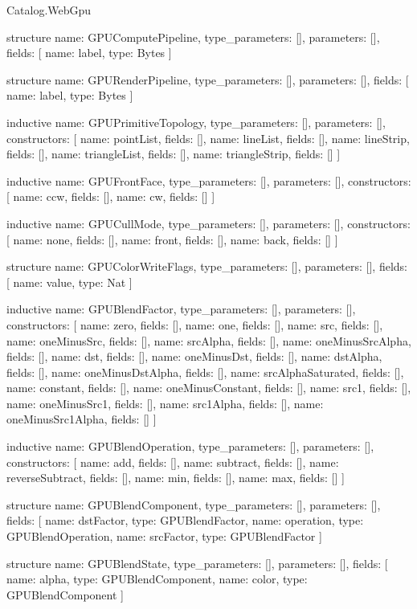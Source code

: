 \begin{lexlean}{Catalog.WebGpu}
\begin{semanticmodule}
structure{
  name: GPUComputePipeline,
  type_parameters: [],
  parameters: [],
  fields: [
    {name: label, type: Bytes}
  ]
}

structure{
  name: GPURenderPipeline,
  type_parameters: [],
  parameters: [],
  fields: [
    {name: label, type: Bytes}
  ]
}

inductive{
  name: GPUPrimitiveTopology,
  type_parameters: [],
  parameters: [],
  constructors: [
    {name: pointList, fields: []},
    {name: lineList, fields: []},
    {name: lineStrip, fields: []},
    {name: triangleList, fields: []},
    {name: triangleStrip, fields: []}
  ]
}

inductive{
  name: GPUFrontFace,
  type_parameters: [],
  parameters: [],
  constructors: [
    {name: ccw, fields: []},
    {name: cw, fields: []}
  ]
}

inductive{
  name: GPUCullMode,
  type_parameters: [],
  parameters: [],
  constructors: [
    {name: none, fields: []},
    {name: front, fields: []},
    {name: back, fields: []}
  ]
}

structure{
  name: GPUColorWriteFlags,
  type_parameters: [],
  parameters: [],
  fields: [
    {name: value, type: Nat}
  ]
}

inductive{
  name: GPUBlendFactor,
  type_parameters: [],
  parameters: [],
  constructors: [
    {name: zero, fields: []},
    {name: one, fields: []},
    {name: src, fields: []},
    {name: oneMinusSrc, fields: []},
    {name: srcAlpha, fields: []},
    {name: oneMinusSrcAlpha, fields: []},
    {name: dst, fields: []},
    {name: oneMinusDst, fields: []},
    {name: dstAlpha, fields: []},
    {name: oneMinusDstAlpha, fields: []},
    {name: srcAlphaSaturated, fields: []},
    {name: constant, fields: []},
    {name: oneMinusConstant, fields: []},
    {name: src1, fields: []},
    {name: oneMinusSrc1, fields: []},
    {name: src1Alpha, fields: []},
    {name: oneMinusSrc1Alpha, fields: []}
  ]
}

inductive{
  name: GPUBlendOperation,
  type_parameters: [],
  parameters: [],
  constructors: [
    {name: add, fields: []},
    {name: subtract, fields: []},
    {name: reverseSubtract, fields: []},
    {name: min, fields: []},
    {name: max, fields: []}
  ]
}

structure{
  name: GPUBlendComponent,
  type_parameters: [],
  parameters: [],
  fields: [
    {name: dstFactor, type: GPUBlendFactor},
    {name: operation, type: GPUBlendOperation},
    {name: srcFactor, type: GPUBlendFactor}
  ]
}

structure{
  name: GPUBlendState,
  type_parameters: [],
  parameters: [],
  fields: [
    {name: alpha, type: GPUBlendComponent},
    {name: color, type: GPUBlendComponent}
  ]
}


\end{semanticmodule}
\end{lexlean}
